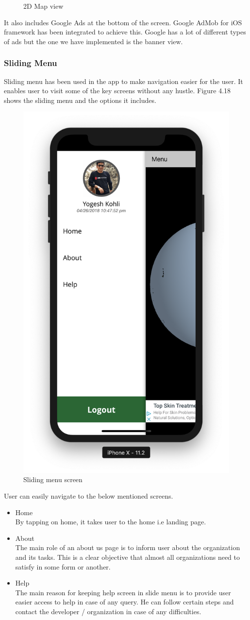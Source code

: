 \begin{figure}[!htb]
\begin{minipage}{0.5\textwidth}
            \caption{2D Map view}\label{Fig:home_map}
        \end{minipage}
    \end{figure}
    
    It also includes Google Ads at the bottom of the screen. Google AdMob for \gls{iOS} framework has been integrated to achieve this. Google has a lot of different types of ads but the one we have implemented is the banner view.

\subsubsection{Sliding Menu}

Sliding menu has been used in the app to make navigation easier for the user. It enables user to visit some of the key screens without any hustle. Figure 4.18 shows the sliding menu and the options it includes.

    \begin{figure}[H]
            \centering
            \includegraphics[width=0.25\linewidth]{figures/ch4/side_menu.png}
            \caption{\label{fig:side_menu_ch4} Sliding menu screen}
    \end{figure}

    User can easily navigate to the below mentioned screens.

    \begin{itemize}
    \item Home \\
    By tapping on home, it takes user to the home i.e landing page.
    
        \item About \\
            The main role of an about us page is to inform user about the organization and its tasks. This is a clear objective that almost all organizations need to satisfy in some form or another.
    
         \item Help \\
            The main reason for keeping help screen in slide menu is to provide user easier access to help in case of any query. He can follow certain steps and contact the developer / organization in case of any difficulties.
            
    \end{itemize}

